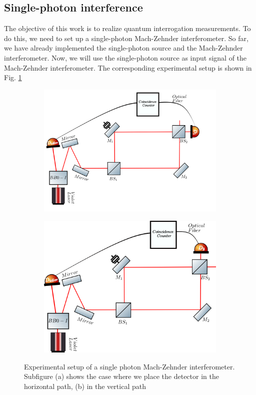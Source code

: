 \documentclass[12pt]{book}
\begin{document}
\subsection{Single-photon interference}


The objective of this work is to realize quantum interrogation measurements. To do this, we need to set up a single-photon Mach-Zehnder interferometer. So far, we have already implemented the single-photon source and the Mach-Zehnder interferometer. Now, we will use the single-photon source as input signal of the Mach-Zehnder interferometer. The corresponding experimental setup is shown in Fig. \ref{newsingle} 


\begin{figure}[t!]
\centering
\begin{subfigure}[b]{0.45\linewidth}
\includegraphics[scale=0.25]{images/machzehnder_single1.png}
\caption{}
\end{subfigure}
\begin{subfigure}[b]{0.45\linewidth}
\includegraphics[scale=0.25]{images/machzehnder_single2.png}
\caption{}
\end{subfigure}
\caption{Experimental setup of a single photon Mach-Zehnder interferometer. Subfigure (a) shows the case where we place the detector in the horizontal path, (b) in the vertical path}
\label{newsingle}
\end{figure}
\end{document}

